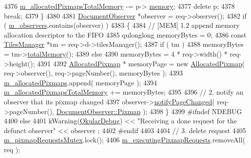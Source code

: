 \begin{DoxyCode}
4376             \hyperlink{classOkular_1_1DocumentPrivate_accbd72ead7fca72852b516f580d2abf1}{m\_allocatedPixmapsTotalMemory} -= p->
      \hyperlink{structAllocatedPixmap_a8fdfc9d87d0ce0852716295895606be0}{memory};
4377             \textcolor{keyword}{delete} p;
4378             \textcolor{keywordflow}{break};
4379         \}
4380 
4381     \hyperlink{classOkular_1_1DocumentObserver}{DocumentObserver} *observer = req->observer();
4382     \textcolor{keywordflow}{if} ( \hyperlink{classOkular_1_1DocumentPrivate_a604d83cdce56b4cab8d2bcccfc01fbfa}{m\_observers}.contains(observer) )
4383     \{
4384         \textcolor{comment}{// [MEM] 1.2 append memory allocation descriptor to the FIFO}
4385         qulonglong memoryBytes = 0;
4386         \textcolor{keyword}{const} \hyperlink{classOkular_1_1TilesManager}{TilesManager} *tm = req->d->tilesManager();
4387         \textcolor{keywordflow}{if} ( tm )
4388             memoryBytes = tm->\hyperlink{classOkular_1_1TilesManager_a7baf6b1ce882f1fea1499fa956097c23}{totalMemory}();
4389         \textcolor{keywordflow}{else}
4390             memoryBytes = 4 * req->width() * req->height();
4391 
4392         \hyperlink{structAllocatedPixmap}{AllocatedPixmap} * memoryPage = \textcolor{keyword}{new} \hyperlink{structAllocatedPixmap}{AllocatedPixmap}( req->observer(), 
      req->pageNumber(), memoryBytes );
4393         \hyperlink{classOkular_1_1DocumentPrivate_a13e55dcfc91cfbe1ff91a55312f3e39f}{m\_allocatedPixmaps}.append( memoryPage );
4394         \hyperlink{classOkular_1_1DocumentPrivate_accbd72ead7fca72852b516f580d2abf1}{m\_allocatedPixmapsTotalMemory} += memoryBytes;
4395 
4396         \textcolor{comment}{// 2. notify an observer that its pixmap changed}
4397         observer->\hyperlink{classOkular_1_1DocumentObserver_abf7600dabd7d6c1e38c950d99f7be595}{notifyPageChanged}( req->pageNumber(), 
      \hyperlink{classOkular_1_1DocumentObserver_af0e6b09d5fc7ecb673bd4895ef2710dca3263576701c6ec7dc0a8e8945054db56}{DocumentObserver::Pixmap} );
4398     \}
4399 \textcolor{preprocessor}{#ifndef NDEBUG}
4400     \textcolor{keywordflow}{else}
4401         kWarning(\hyperlink{debug__p_8h_af16c6e32a95969dd0605d792ec9807c7}{OkularDebug}) << \textcolor{stringliteral}{"Receiving a done request for the defunct observer"} << observer
      ;
4402 \textcolor{preprocessor}{#endif}
4403 
4404     \textcolor{comment}{// 3. delete request}
4405     \hyperlink{classOkular_1_1DocumentPrivate_a5c0e919d575a7a3c19a42c64a672fce4}{m\_pixmapRequestsMutex}.lock();
4406     \hyperlink{classOkular_1_1DocumentPrivate_adc84c2f8f76e7880b41e155edabf69e7}{m\_executingPixmapRequests}.removeAll( req );

\end{DoxyCode}
